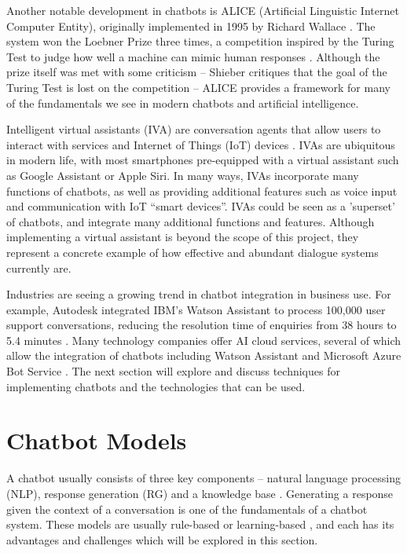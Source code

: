 Another notable development in chatbots is ALICE (Artificial Linguistic Internet Computer Entity), originally implemented in 1995 by Richard Wallace \cite{wallace2009anatomy}. The system won the Loebner Prize three times, a competition inspired by the Turing Test to judge how well a machine can mimic human responses \cite{keedwell2014loebner}. Although the prize itself was met with some criticism -- Shieber critiques that the goal of the Turing Test is lost on the competition \cite{shieber1994lessons} -- ALICE provides a framework for many of the fundamentals we see in modern chatbots and artificial intelligence.

Intelligent virtual assistants (IVA) are conversation agents that allow users to interact with services and Internet of Things (IoT) devices \cite{chung2018intelligent}. IVAs are ubiquitous in modern life, with most smartphones pre-equipped with a virtual assistant such as Google Assistant or Apple Siri. In many ways, IVAs incorporate many functions of chatbots, as well as providing additional features such as voice input and communication with IoT “smart devices”. IVAs could be seen as a 'superset' of chatbots, and integrate many additional functions and features. Although implementing a virtual assistant is beyond the scope of this project, they represent a concrete example of how effective and abundant dialogue systems currently are.

Industries are seeing a growing trend in chatbot integration in business use. For example, Autodesk integrated IBM’s Watson Assistant \cite{ibm2017watson} to process 100,000 user support conversations, reducing the resolution time of enquiries from 38 hours to 5.4 minutes \cite{ibm2017autodesk}. Many technology companies offer AI cloud services, several of which allow the integration of chatbots including Watson Assistant and Microsoft Azure Bot Service \cite{microsoft2019azure}. The next section will explore and discuss techniques for implementing chatbots and the technologies that can be used.

\newpage
\section{Chatbot Models}
A chatbot usually consists of three key components – natural language processing (NLP), response generation (RG) and a knowledge base \cite{cahn2017chatbot}. Generating a response given the context of a conversation is one of the fundamentals of a chatbot system. These models are usually rule-based or learning-based \cite{wang2013dataset}, and each has its advantages and challenges which will be explored in this section.

